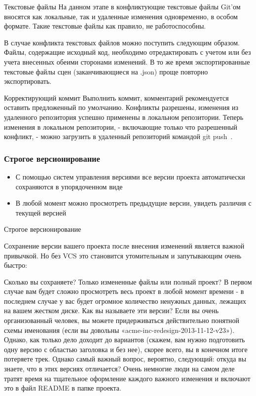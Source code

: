 \documentclass{../industrial-development}
\begin{document}
Текстовые файлы
На данном этапе в конфликтующие текстовые файлы Git’ом вносятся как локальные, так и удаленные изменения одновременно, в особом формате. Такие текстовые файлы как правило, не работоспособны.

В случае конфликта текстовых файлов можно поступить следующим образом. Файлы, содержащие исходный код, необходимо отредактировать с учетом или без учета внесенных обеими сторонами изменений. В то же время экспортированные текстовые файлы сцен (заканчивающиеся на .json) проще повторно экспортировать.

Корректирующий коммит
Выполнить коммит, комментарий рекомендуется оставить предложенный по умолчанию.
Конфликты разрешены, изменения из удаленного репозитория успешно применены в локальном репозитории. Теперь изменения в локальном репозитории, - включающие только что разрешенный конфликт, - можно загрузить в удаленный репозиторий командой git push~\cite{Blend4web}.

\begin{frame} \frametitle{Строгое версионирование}
  \begin{itemize}
  \item С помощью систем управления версиями все версии проекта автоматически сохраняются в упорядоченном виде
  \item В любой момент можно просмотреть предыдущие версии, увидеть различия с текущей версией
  \end{itemize}
\end{frame}

\lecturenotes

Строгое версионирование

Сохранение версии вашего проекта после внесения изменений является важной привычкой. Но без VCS это становится утомительным и запутывающим очень быстро:

    Сколько вы сохраняете? Только измененные файлы или полный проект? В первом случае вам будет сложно просмотреть весь проект в любой момент времени - в последнем случае у вас будет огромное количество ненужных данных, лежащих на вашем жестком диске.
    Как вы называете эти версии? Если вы очень организованный человек, вы можете придерживаться действительно понятной схемы именования (если вы довольны «acme-inc-redesign-2013-11-12-v23»). Однако, как только дело доходит до вариантов (скажем, вам нужно подготовить одну версию с областью заголовка и без нее), скорее всего, вы в конечном итоге потеряете трек.
    Однако самый важный вопрос, вероятно, следующий: откуда вы знаете, что в этих версиях отличается? Очень немногие люди на самом деле тратят время на тщательное оформление каждого важного изменения и включают это в файл README в папке проекта.
\end{document}
